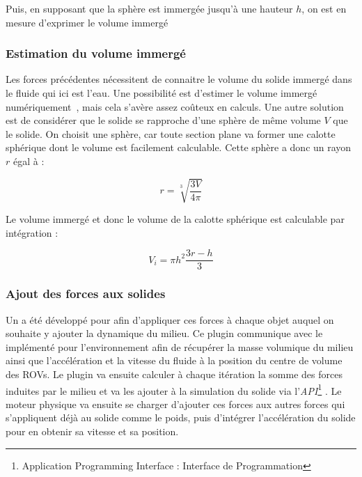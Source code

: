 				Puis, en supposant que la sphère est immergée jusqu'à une hauteur $h$, on est en mesure d'exprimer le volume immergé 

			\subsubsection{Estimation du volume immergé}

				Les forces précédentes nécessitent de connaitre le volume du solide immergé dans le fluide qui ici est l'eau. Une possibilité est d'estimer le volume immergé numériquement~\cite{gilloteaux:tel-00521689}, mais cela s'avère assez coûteux en calculs. Une autre solution est de considérer que le solide se rapproche d'une sphère de même volume $V$ que le solide. On choisit une sphère, car toute section plane va former une calotte sphérique dont le volume est facilement calculable. Cette sphère a donc un rayon $r$ égal à :

				\begin{equation}
					r = \sqrt[3]{\frac{3 V}{4 \pi}}
				\end{equation}

				Le volume immergé et donc le volume de la calotte sphérique est calculable par intégration :

				\begin{equation}
					V_i = \pi h^2\frac{3r-h}{3} \label{eqn:v_immerge}
				\end{equation}



			\subsubsection{Ajout des forces aux solides}

				Un \plugin{} a été développé pour \gazebo{} afin d'appliquer ces forces à chaque objet auquel on souhaite y ajouter la dynamique du milieu. Ce plugin communique avec le \plugin{} implémenté pour l'environnement afin de récupérer la masse volumique du milieu ainsi que l'accélération et la vitesse du fluide à la position du centre de volume des \gls{ROV}s. Le plugin va ensuite calculer à chaque itération la somme des forces induites par le milieu et va les ajouter à la simulation du solide via l'\textit{API}\footnote{Application Programming Interface : Interface de Programmation} \gazebo{}. Le moteur physique va ensuite se charger d'ajouter ces forces aux autres forces qui s'appliquent déjà au solide comme le poids, puis d'intégrer l'accélération du solide pour en obtenir sa vitesse et sa position.

